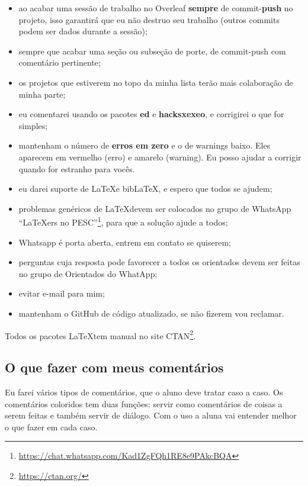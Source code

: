 \documentclass{article}
\begin{document}
\begin{itemize}
    \item ao acabar uma sessão de trabalho no Overleaf \textbf{sempre} de commit-\textbf{push} no projeto, isso garantirá que eu não destruo seu trabalho (outros commits podem ser dados durante a sessão);
    \item sempre que acabar uma seção ou subseção de porte, de commit-push com comentário pertinente;
    \item os projetos que estiverem no topo da minha lista terão mais colaboração de minha parte;
    \item eu comentarei usando os pacotes \textbf{ed} e \textbf{hacksxexeo}, e corrigirei o que for simples;
    \item mantenham o número de \textbf{erros em zero} e o de warnings baixo. Eles aparecem em vermelho (erro) e amarelo (warning). Eu posso ajudar a corrigir quando for estranho para vocês.
    \item eu darei suporte de \LaTeX e bib\LaTeX, e espero que todos se ajudem;
    \item problemas genéricos de \LaTeX devem ser colocados no grupo de WhatsApp ``\LaTeX ers no PESC''\footnote{\url{https://chat.whatsapp.com/Kad1ZgFQh1RE8e9PAkcBQA}}, para que a solução ajude a todos;
    \item Whatsapp é porta aberta, entrem em contato se quiserem;
    \item perguntas cuja resposta pode favorecer a todos os orientados devem ser feitas no grupo de Orientados do WhatApp;
    \item evitar e-mail para mim;
    \item mantenham o GitHub de código atualizado, se não fizerem vou reclamar.
\end{itemize}

Todos os pacotes \LaTeX tem manual no site CTAN\footnote{\url{https://ctan.org/}}.

\subsection{O que fazer com meus comentários}

Eu farei vários tipos de comentários, que o aluno deve tratar caso a caso. Os comentários coloridos tem duas funções: servir como comentários de coisas a serem feitas e também servir de diálogo. Com o uso a aluna vai entender melhor o que fazer em cada caso.
\end{document}
